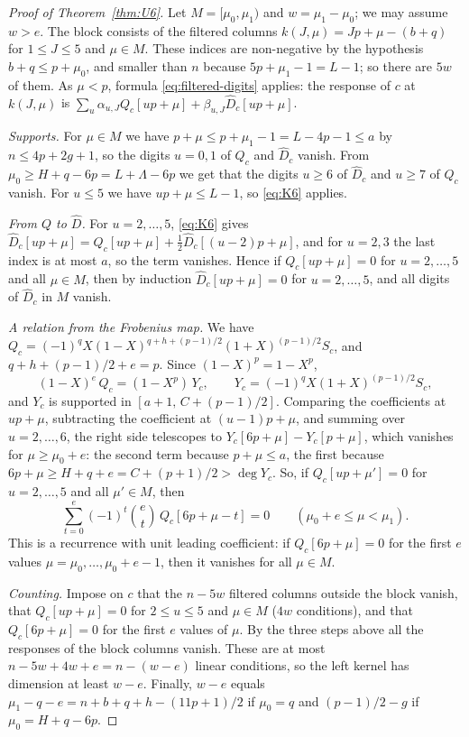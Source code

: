 \begin{proof}[Proof of Theorem~\ref{thm:U6}]
Let $M=[\mu_0,\mu_1)$ and $w=\mu_1-\mu_0$; we may assume $w>e$. The block consists of the filtered columns
$k(J,\mu)=Jp+\mu-(b+q)$ for $1\le J\le5$ and $\mu\in M$. These indices are non-negative by the hypothesis
$b+q\le p+\mu_0$, and smaller than $n$ because $5p+\mu_1-1=L-1$; so there are $5w$ of them. As $\mu<p$, formula
\eqref{eq:filtered-digits} applies: the response of $c$ at $k(J,\mu)$ is
$\sum_u\alpha_{u,J}Q_c[up+\mu]+\beta_{u,J}\widehat D_c[up+\mu]$.

\emph{Supports.} For $\mu\in M$ we have $p+\mu\le p+\mu_1-1=L-4p-1\le a$ by $n\le4p+2g+1$, so the digits
$u=0,1$ of $Q_c$ and $\widehat D_c$ vanish. From $\mu_0\ge H+q-6p=L+\Lambda-6p$ we get that the digits $u\ge6$ of
$\widehat D_c$ and $u\ge7$ of $Q_c$ vanish. For $u\le5$ we have $up+\mu\le L-1$, so \eqref{eq:K6} applies.

\emph{From $Q$ to $\widehat D$.} For $u=2,\dots,5$, \eqref{eq:K6} gives
$\widehat D_c[up+\mu]=Q_c[up+\mu]+\tfrac12\widehat D_c[(u-2)p+\mu]$, and for $u=2,3$ the last index is at most $a$,
so the term vanishes. Hence if $Q_c[up+\mu]=0$ for $u=2,\dots,5$ and all $\mu\in M$, then by induction
$\widehat D_c[up+\mu]=0$ for $u=2,\dots,5$, and all digits of $\widehat D_c$ in $M$ vanish.

\emph{A relation from the Frobenius map.} We have
$Q_c=(-1)^qX(1-X)^{q+h+(p-1)/2}(1+X)^{(p-1)/2}S_c$, and $q+h+(p-1)/2+e=p$. Since $(1-X)^p=1-X^p$,
\[
 (1-X)^e\,Q_c=(1-X^p)\,Y_c,\qquad Y_c=(-1)^qX(1+X)^{(p-1)/2}S_c,
\]
and $Y_c$ is supported in $[a+1,\,C+(p-1)/2]$. Comparing the coefficients at $up+\mu$, subtracting the
coefficient at $(u-1)p+\mu$, and summing over $u=2,\dots,6$, the right side telescopes to
$Y_c[6p+\mu]-Y_c[p+\mu]$, which vanishes for $\mu\ge\mu_0+e$: the second term because $p+\mu\le a$, the
first because $6p+\mu\ge H+q+e=C+(p+1)/2>\deg Y_c$. So, if $Q_c[up+\mu']=0$ for $u=2,\dots,5$ and all
$\mu'\in M$, then
\[
 \sum_{t=0}^e(-1)^t\binom et\,Q_c[6p+\mu-t]=0\qquad(\mu_0+e\le\mu<\mu_1).
\]
This is a recurrence with unit leading coefficient: if $Q_c[6p+\mu]=0$ for the first $e$ values
$\mu=\mu_0,\dots,\mu_0+e-1$, then it vanishes for all $\mu\in M$.

\emph{Counting.} Impose on $c$ that the $n-5w$ filtered columns outside the block vanish, that
$Q_c[up+\mu]=0$ for $2\le u\le5$ and $\mu\in M$ ($4w$ conditions), and that $Q_c[6p+\mu]=0$ for the first $e$
values of $\mu$. By the three steps above all the responses of the block columns vanish. These are at
most $n-5w+4w+e=n-(w-e)$ linear conditions, so the left kernel has dimension at least $w-e$. Finally,
$w-e$ equals $\mu_1-q-e=n+b+q+h-(11p+1)/2$ if $\mu_0=q$ and $(p-1)/2-g$ if $\mu_0=H+q-6p$.
\end{proof}

